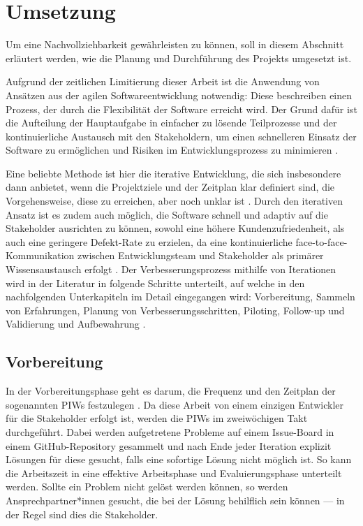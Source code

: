 \section{Umsetzung}
\label{sec:umsetzung}
Um eine Nachvollziehbarkeit gewährleisten zu können, soll in diesem Abschnitt erläutert werden, wie die Planung und Durchführung des Projekts umgesetzt ist.

Aufgrund der zeitlichen Limitierung dieser Arbeit ist die Anwendung von Ansätzen aus der agilen Softwareentwicklung notwendig: Diese beschreiben einen Prozess, der durch die Flexibilität der Software erreicht wird. Der Grund dafür ist die Aufteilung der Hauptaufgabe in einfacher zu lösende Teilprozesse und der kontinuierliche Austausch mit den Stakeholdern, um einen schnelleren Einsatz der Software zu ermöglichen und Risiken im Entwicklungsprozess zu minimieren \cite{Siepermann2018}. 

Eine beliebte Methode ist hier die iterative Entwicklung, die sich insbesondere dann anbietet, wenn die Projektziele und der Zeitplan klar definiert sind, die Vorgehensweise, diese zu erreichen, aber noch unklar ist \cite{salo2007iterative}. Durch den iterativen Ansatz ist es zudem auch möglich, die Software schnell und adaptiv auf die Stakeholder ausrichten zu können, sowohl eine höhere Kundenzufriedenheit, als auch eine geringere Defekt-Rate zu erzielen, da eine kontinuierliche face-to-face-Kommunikation zwischen Entwicklungsteam und Stakeholder als primärer Wissensaustausch erfolgt \cite{salo2007iterative}. Der Verbesserungsprozess mithilfe von Iterationen wird in der Literatur in folgende Schritte unterteilt, auf welche in den nachfolgenden Unterkapiteln im Detail eingegangen wird: Vorbereitung, Sammeln von Erfahrungen, Planung von Verbesserungsschritten, Piloting, Follow-up und Validierung und Aufbewahrung \cite{salo2007iterative}.

\subsection{Vorbereitung}
In der Vorbereitungsphase geht es darum, die Frequenz und den Zeitplan der sogenannten \ac{PIW}s festzulegen \cite{salo2007iterative}. Da diese Arbeit von einem einzigen Entwickler für die Stakeholder erfolgt ist, werden die PIWs im zweiwöchigen Takt durchgeführt. Dabei werden aufgetretene Probleme auf einem Issue-Board in einem GitHub-Repository gesammelt und nach Ende jeder Iteration explizit Lösungen für diese gesucht, falls eine sofortige Lösung nicht möglich ist. So kann die Arbeitszeit in eine effektive Arbeitsphase und Evaluierungsphase unterteilt werden. Sollte ein Problem nicht gelöst werden können, so werden Ansprechpartner*innen gesucht, die bei der Lösung behilflich sein können --- in der Regel sind dies die Stakeholder.

